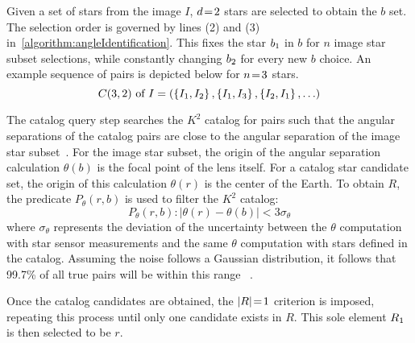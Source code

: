 \documentclass[conference]{IEEEtran}
\begin{document}
    Given a set of stars from the image $I$, $d \!=\! 2$ stars are selected to obtain the $b$ set.
    The selection order is governed by lines (2) and (3) in~\autoref{algorithm:angleIdentification}.
    This fixes the star $b_1$ in $b$ for $n$ image star subset selections, while constantly changing
    $b_2$ for every new $b$ choice.
    An example sequence of pairs is depicted below for $n \!=\! 3$ stars.
    \begin{equation}
        C(3, 2) \text{ of } I = \left(\left\{ I_1, I_2 \right\}, \left\{ I_1,I_3 \right\}, \left\{ I_2,I_1 \right\},
        \ldots \right)
    \end{equation}

    The catalog query step searches the $K^2$ catalog for pairs such that the angular separations of the catalog pairs
    are close to the angular separation of the image star subset~\cite{bratt:analysisStarIdentification}.
    For the image star subset, the origin of the angular separation calculation $\theta(b)$ is the focal point of the lens
    itself.
    For a catalog star candidate set, the origin of this calculation $\theta(r)$ is the center of the Earth.
    To obtain $R$, the predicate $P_\theta(r, b)$ is used to filter the $K^2$ catalog:
    \begin{equation}\label{eq:angleRequirement}
    P_{\theta}(r, b) : \left\lvert \theta(r) - \theta(b)\right\rvert < 3 \sigma_\theta
    \end{equation}
    where $\sigma_{\theta}$ represents the deviation of the uncertainty between the $\theta$ computation with star
    sensor measurements and the same $\theta$ computation with stars defined in the catalog.
    Assuming the noise follows a Gaussian distribution, it follows that 99.7\% of all true pairs will be within this range
    ~\cite{coleAndCrassidis:sphericalTriangleMethod}.

    Once the catalog candidates are obtained, the $\left| R \right| \!=\! 1$ criterion is imposed, repeating this process until only
    one candidate exists in $R$.
    This sole element $R_1$ is then selected to be $r$.
\end{document}

